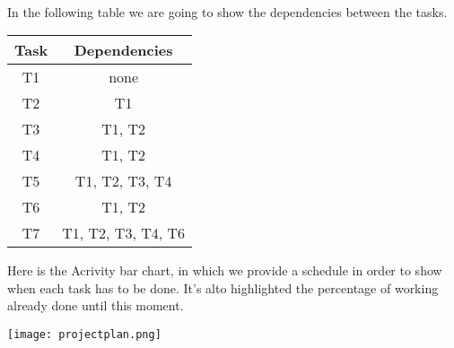\\

In the following table we are going to show the dependencies between the tasks.
\begin{center}
	\begin{tabular}{c c}
		\hline
		\textbf{Task} & \textbf{Dependencies} \\
		\hline
		T1 & none \\
		T2 & T1 \\
		T3 & T1, T2 \\
		T4 & T1, T2 \\
		T5 & T1, T2, T3, T4 \\
		T6 & T1, T2 \\
		T7 & T1, T2, T3, T4, T6 \\
		\hline
	\end{tabular}
\end{center}
Here is the Acrivity bar chart, in which we provide a schedule in order to show when each task has to be done. It's alto highlighted the percentage of working already done until this moment.  
\begin{center}
	\texttt{[image: projectplan.png]}
\end{center}

